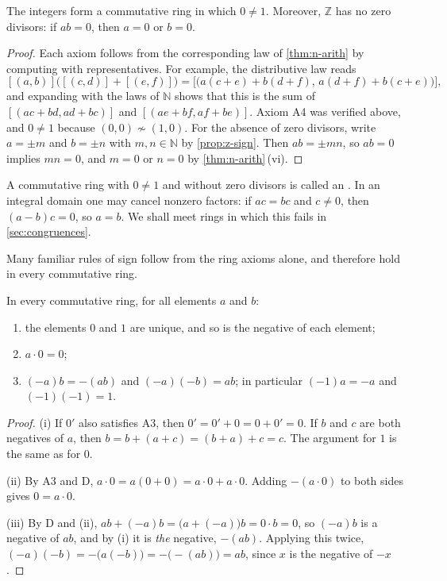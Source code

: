 \begin{theorem}
\label{thm:z-ring}
The integers form a commutative ring in which $0\ne1$. Moreover, $\mathbb Z$ has no zero divisors: if $ab=0$, then $a=0$ or $b=0$.
\end{theorem}

\begin{proof}
Each axiom follows from the corresponding law of \cref{thm:n-arith} by computing with representatives. For example, the distributive law reads
\[
[(a,b)]\bigl([(c,d)]+[(e,f)]\bigr)=\bigl[\bigl(a(c+e)+b(d+f),\,a(d+f)+b(c+e)\bigr)\bigr],
\]
and expanding with the laws of $\mathbb N$ shows that this is the sum of $[(ac+bd,ad+bc)]$ and $[(ae+bf,af+be)]$. Axiom A4 was verified above, and $0\ne1$ because $(0,0)\not\sim(1,0)$. For the absence of zero divisors, write $a=\pm m$ and $b=\pm n$ with $m,n\in\mathbb N$ by \cref{prop:z-sign}. Then $ab=\pm mn$, so $ab=0$ implies $mn=0$, and $m=0$ or $n=0$ by \cref{thm:n-arith}\,(vi).
\end{proof}

A commutative ring with $0\ne1$ and without zero divisors is called an . In an integral domain one may cancel nonzero factors: if $ac=bc$ and $c\ne0$, then $(a-b)c=0$, so $a=b$. We shall meet rings in which this fails in \cref{sec:congruences}.

Many familiar rules of sign follow from the ring axioms alone, and therefore hold in every commutative ring.

\begin{proposition}
\label{prop:ring-rules}
In every commutative ring, for all elements $a$ and $b$:
\begin{enumerate}
\item the elements $0$ and $1$ are unique, and so is the negative of each element;
\item $a\cdot0=0$;
\item $(-a)b=-(ab)$ and $(-a)(-b)=ab$; in particular $(-1)a=-a$ and $(-1)(-1)=1$.
\end{enumerate}
\end{proposition}

\begin{proof}
(i) If $0'$ also satisfies A3, then $0'=0'+0=0+0'=0$. If $b$ and $c$ are both negatives of $a$, then $b=b+(a+c)=(b+a)+c=c$. The argument for $1$ is the same as for $0$.

(ii) By A3 and D, $a\cdot0=a(0+0)=a\cdot0+a\cdot0$. Adding $-(a\cdot0)$ to both sides gives $0=a\cdot0$.

(iii) By D and (ii), $ab+(-a)b=\bigl(a+(-a)\bigr)b=0\cdot b=0$, so $(-a)b$ is a negative of $ab$, and by (i) it is \emph{the} negative, $-(ab)$. Applying this twice, $(-a)(-b)=-\bigl(a(-b)\bigr)=-\bigl(-(ab)\bigr)=ab$, since $x$ is the negative of $-x$.
\end{proof}

